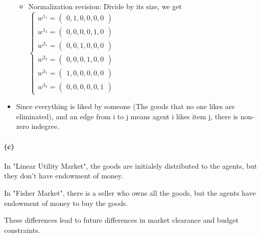 \documentclass{article}
\newenvironment{answer}{\par\color{ForestGreen}}{\par}
\begin{document}
\begin{answer}
\begin{itemize}
\begin{itemize}
      \item Normalization revision: Divide by its size, we get
      $\begin{cases}
         w^{1_1} = \begin{pmatrix} 0, 1, 0, 0, 0, 0 \end{pmatrix} \\
         w^{1_2} = \begin{pmatrix} 0, 0, 0, 0, 1, 0 \end{pmatrix} \\
         w^{2_1} = \begin{pmatrix} 0, 0, 1, 0, 0, 0 \end{pmatrix} \\
         w^{2_2} = \begin{pmatrix} 0, 0, 0, 1, 0, 0 \end{pmatrix} \\
         w^{3_1} = \begin{pmatrix} 1, 0, 0, 0, 0, 0 \end{pmatrix} \\
         w^{3_2} = \begin{pmatrix} 0, 0, 0, 0, 0, 1 \end{pmatrix}
       \end{cases} $
    \end{itemize}


    \item Since everything is liked by someone (The goods that no one likes are eliminated), and an edge from i to j means agent i likes item j, there is non-zero indegree.
  \end{itemize}

  \paragraph{(c)}
  \hfill \break
  In "Linear Utility Market", the goods are initialely distributed to the agents, but they don't have endowment of money.

  In "Fisher Market", there is a seller who owns all the goods, but the agents have endowment of money to buy the goods.


  These differences lead to future differences in market clearance and budget constraints.
\end{answer}
\end{document}
